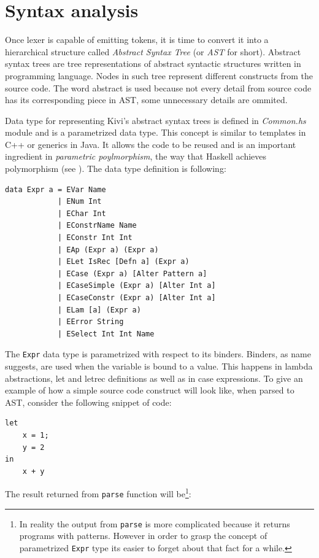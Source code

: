 \documentclass[12pt,a4paper]{report}
\begin{document}
\section{Syntax analysis}
\label{sec:syntax_analysis}
Once lexer is capable of emitting tokens, it is time to convert it into a
hierarchical structure called \textit{Abstract Syntax Tree} (or \textit{AST}
for short). Abstract syntax trees are tree representations of abstract
syntactic structures written in programming language. Nodes in such tree
represent different constructs from the source code. The word abstract is used
because not every detail from source code has its corresponding piece in AST,
some unnecessary details are ommited.

Data type for representing Kivi's abstract syntax trees is defined in
\textit{Common.hs} module and is a parametrized data type. This concept is
similar to templates in C++ or generics in Java. It allows the code to be
reused and is an important ingredient in \textit{parametric poylmorphism}, the
way that Haskell achieves polymorphism (see
\cite{website:parametric_polymorphism}). The data type definition is following:

\vspace*{0.2in}
\begin{lstlisting}
data Expr a = EVar Name
            | ENum Int
            | EChar Int
            | EConstrName Name
            | EConstr Int Int
            | EAp (Expr a) (Expr a)
            | ELet IsRec [Defn a] (Expr a)
            | ECase (Expr a) [Alter Pattern a]
            | ECaseSimple (Expr a) [Alter Int a]
            | ECaseConstr (Expr a) [Alter Int a]
            | ELam [a] (Expr a)
            | EError String
            | ESelect Int Int Name
\end{lstlisting}
The \texttt{Expr} data type is parametrized with respect to its binders.
Binders, as name suggests, are used when the variable is bound to a value. This
happens in lambda abstractions, let and letrec definitions as well as in
case expressions. To give an example of how a simple source code
construct will look like, when parsed to AST, consider the following
snippet of code:

\vspace*{0.2in}
\begin{lstlisting}
let
    x = 1;
    y = 2
in
    x + y
\end{lstlisting}
The result returned from \texttt{parse} function will be\footnote{In reality
the output from \texttt{parse} is more complicated because it returns programs
with patterns. However in order to grasp the concept of parametrized
\texttt{Expr} type its easier to forget about that fact for a while.}:
\end{document}
